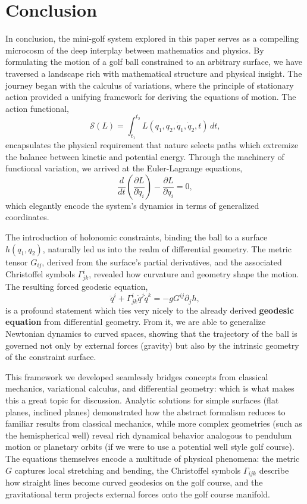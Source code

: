 \section{Conclusion}

In conclusion, the mini-golf system explored in this paper serves as a compelling microcosm of the deep interplay between mathematics and physics. By formulating the motion of a golf ball constrained to an arbitrary surface, we have traversed a landscape rich with mathematical structure and physical insight. The journey began with the calculus of variations, where the principle of stationary action provided a unifying framework for deriving the equations of motion. The action functional,
\begin{equation}
\mathcal{S}(L) = \int_{t_1}^{t_2} L(q_1, q_2, \dot{q}_1, \dot{q}_2, t)\, dt,
\end{equation}
encapsulates the physical requirement that nature selects paths which extremize the balance between kinetic and potential energy. Through the machinery of functional variation, we arrived at the Euler-Lagrange equations,
\begin{equation}
\frac{d}{dt} \left( \frac{\partial L}{\partial \dot{q}_i} \right) - \frac{\partial L}{\partial q_i} = 0,
\end{equation}
which elegantly encode the system's dynamics in terms of generalized coordinates.

The introduction of holonomic constraints, binding the ball to a surface $h(q_1, q_2)$, naturally led us into the realm of differential geometry. The metric tensor $G_{ij}$, derived from the surface's partial derivatives, and the associated Christoffel symbols $\Gamma^i_{jk}$, revealed how curvature and geometry shape the motion. The resulting forced geodesic equation,
\begin{equation}
\ddot{q}^i + \Gamma^i_{jk} \dot{q}^j \dot{q}^k = -g G^{ij} \partial_j h,
\end{equation}
is a profound statement which ties very nicely to the already derived \textbf{geodesic equation} from differential geometry.  From it, we are able to generalize Newtonian dynamics to curved spaces, showing that the trajectory of the ball is governed not only by external forces (gravity) but also by the intrinsic geometry of the constraint surface.

This framework we developed seamlessly bridges concepts from classical mechanics, variational calculus, and differential geometry: which is what makes this a great topic for discussion. Analytic solutions for simple surfaces (flat planes, inclined planes) demonstrated how the abstract formalism reduces to familiar results from classical mechanics, while more complex geometries (such as the hemispherical well) reveal rich dynamical behavior analogous to pendulum motion or planetary orbits (if we were to use a potential well style golf course). The equations themselves encode a multitude of physical phenomena: the metric $G$ captures local stretching and bending, the Christoffel symbols $\Gamma_{ijk}$ describe how straight lines become curved geodesics on the golf course, and the gravitational term projects external forces onto the golf course manifold.

